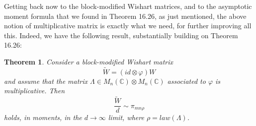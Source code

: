 \documentclass[12pt]{amsbook}
\newtheorem{theorem}{Theorem}[chapter]
\begin{document}
\bigskip

Getting back now to the block-modified Wishart matrices, and to the asymptotic moment formula that we found in Theorem 16.26, as just mentioned, the above notion of multiplicative matrix is exactly what we need, for further improving all this. Indeed, we have the following result, substantially building on Theorem 16.26:

\begin{theorem}
Consider a block-modified Wishart matrix 
$$\widetilde{W}=(id\otimes\varphi)W$$
and assume that the matrix $\Lambda\in M_n(\mathbb C)\otimes M_n(\mathbb C)$ associated to $\varphi$ is multiplicative. Then
$$\frac{\widetilde{W}}{d}\sim\pi_{mn\rho}$$
holds, in moments, in the $d\to\infty$ limit, where $\rho=law(\Lambda)$.
\end{theorem}
\end{document}
